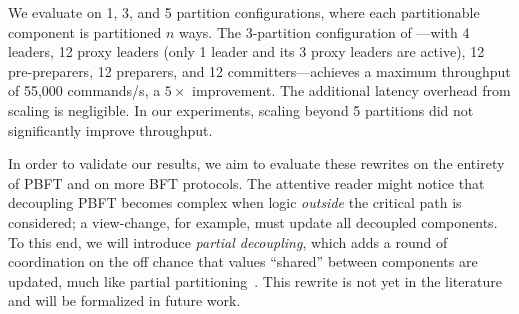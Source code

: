 We evaluate \ScalablePBFT{} on 1, 3, and 5 partition configurations, where each partitionable component is partitioned $n$ ways.
The 3-partition configuration of \ScalablePBFT{}---with 4 leaders, 12 proxy leaders (only 1 leader and its 3 proxy leaders are active), 12 pre-preparers, 12 preparers, and 12 committers---achieves a maximum throughput of 55,000 commands/s, a $5\times$ improvement.
The additional latency overhead from scaling is negligible. 
In our experiments, scaling beyond 5 partitions did not significantly improve throughput.

In order to validate our results, we aim to evaluate these rewrites on the entirety of PBFT and on more BFT protocols.
The attentive reader might notice that decoupling PBFT becomes complex when logic \emph{outside} the critical path is considered; a view-change, for example, must update all decoupled components.
To this end, we will introduce \emph{partial decoupling}, which adds a round of coordination on the off chance that values ``shared'' between components are updated, much like partial partitioning~\cite{autocomp}.
This rewrite is not yet in the literature and will be formalized in future work.
